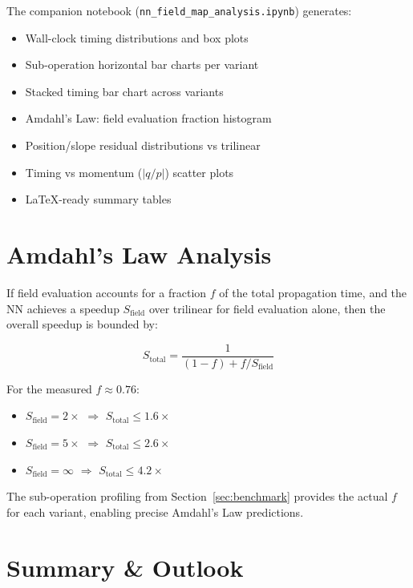\documentclass[11pt,a4paper]{article}
\begin{document}
The companion notebook (\texttt{nn\_field\_map\_analysis.ipynb}) generates:
\begin{itemize}[nosep]
  \item Wall-clock timing distributions and box plots
  \item Sub-operation horizontal bar charts per variant
  \item Stacked timing bar chart across variants
  \item Amdahl's Law: field evaluation fraction histogram
  \item Position/slope residual distributions vs trilinear
  \item Timing vs momentum ($|q/p|$) scatter plots
  \item LaTeX-ready summary tables
\end{itemize}

\section{Amdahl's Law Analysis}
\label{sec:amdahl}

If field evaluation accounts for a fraction $f$ of the total propagation
time, and the NN achieves a speedup $S_\mathrm{field}$ over trilinear for
field evaluation alone, then the overall speedup is bounded by:

$$
S_\mathrm{total} = \frac{1}{(1 - f) + f / S_\mathrm{field}}
$$

For the measured $f \approx 0.76$:
\begin{itemize}[nosep]
  \item $S_\mathrm{field} = 2\times$ $\Rightarrow$ $S_\mathrm{total} \leq 1.6\times$
  \item $S_\mathrm{field} = 5\times$ $\Rightarrow$ $S_\mathrm{total} \leq 2.6\times$
  \item $S_\mathrm{field} = \infty$ $\Rightarrow$ $S_\mathrm{total} \leq 4.2\times$
\end{itemize}

The sub-operation profiling from Section~\ref{sec:benchmark} provides the
actual $f$ for each variant, enabling precise Amdahl's Law predictions.

\section{Summary \& Outlook}
\label{sec:summary}
\end{document}
